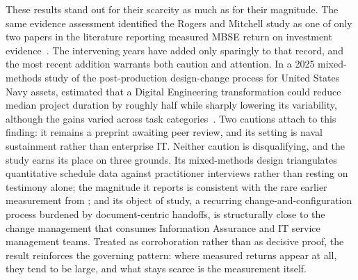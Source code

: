 These results stand out for their scarcity as much as for their magnitude. The same evidence assessment identified the Rogers and Mitchell study as one of only two papers in the literature reporting measured MBSE return on investment evidence~\parencite{Henderson_Salado_2021}. The intervening years have added only sparingly to that record, and the most recent addition warrants both caution and attention. In a 2025 mixed-methods study of the post-production design-change process for United States Navy assets, \citeauthor{Shefa_Topcu_2025} estimated that a Digital Engineering transformation could reduce median project duration by roughly half while sharply lowering its variability, although the gains varied across task categories~\parencite{Shefa_Topcu_2025}. Two cautions attach to this finding: it remains a preprint awaiting peer review, and its setting is naval sustainment rather than enterprise IT. Neither caution is disqualifying, and the study earns its place on three grounds. Its mixed-methods design triangulates quantitative schedule data against practitioner interviews rather than resting on testimony alone; the magnitude it reports is consistent with the rare earlier measurement from \citeauthor{Rogers_Mitchell_2021}; and its object of study, a recurring change-and-configuration process burdened by document-centric handoffs, is structurally close to the change management that consumes Information Assurance and IT service management teams. Treated as corroboration rather than as decisive proof, the result reinforces the governing pattern: where measured returns appear at all, they tend to be large, and what stays scarce is the measurement itself.

